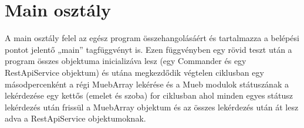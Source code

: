 \documentclass[a4paper,12pt]{article}
\begin{document}
\section{Main osztály}

A main osztály felel az egész program összehangolásáért és tartalmazza a belépési pontot jelentő „main” tagfüggvényt is. Ezen függvényben egy rövid teszt után a program összes objektuma inicializáva lesz (egy Commander és egy RestApiService objektum) és utána megkezdődik végtelen ciklusban egy másodpercenként a régi MuebArray lekérése és a Mueb modulok státuszának a lekérdezése egy kettős (emelet és szoba) for ciklusban ahol minden egyes státusz lekérdezés után frissül a MuebArray objektum és az összes lekérdezés után át lesz adva a RestApiService objektumoknak.
\end{document}
